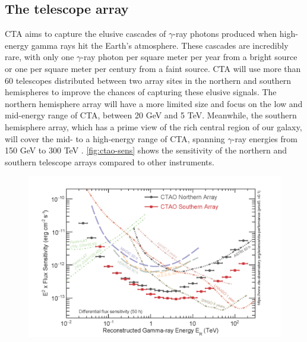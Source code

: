 \subsection{The telescope array}
\label{ss:telescope-array}
CTA aims to capture the elusive cascades of $\gamma$-ray photons produced when high-energy gamma rays hit the Earth's atmosphere. These cascades are incredibly rare, with only one $\gamma$-ray photon per square meter per year from a bright source or one per square meter per century from a faint source. CTA will use more than 60 telescopes distributed between two array sites in the northern and southern hemispheres to improve the chances of capturing these elusive signals. The northern hemisphere array will have a more limited size and focus on the low and mid-energy range of CTA, between 20 GeV and 5 TeV. Meanwhile, the southern hemisphere array, which has a prime view of the rich central region of our galaxy, will cover the mid- to a high-energy range of CTA, spanning $\gamma$-ray energies from 150 GeV to 300 TeV \cite{Acharyya201935}. \autoref{fig:ctao-sens} shows the sensitivity of the northern and southern telescope arrays compared to other instruments. 
\begin{figure}[h]
\centering
\includegraphics[width=1\linewidth]{figures/introduction/ctao-sensitivity.png}
\label{fig:ctao-sens}
\end{figure}
